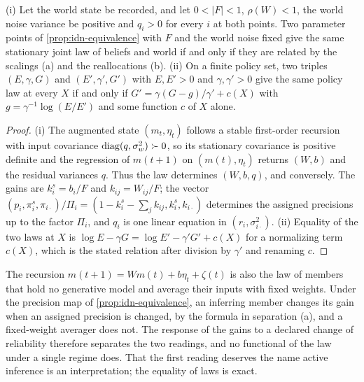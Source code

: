 \begin{corollary}\label{cor:idn-fibre}
(i) Let the world state be recorded, and let $0<|F|<1$, $\rho(W)<1$, the world noise variance be positive and $q_i>0$ for every $i$ at both points. Two parameter points of \cref{prop:idn-equivalence} with $F$ and the world noise fixed give the same stationary joint law of beliefs and world if and only if they are related by the scalings (a) and the reallocations (b). (ii) On a finite policy set, two triples $(E,\gamma,G)$ and $(E',\gamma',G')$ with $E,E'>0$ and $\gamma,\gamma'>0$ give the same policy law at every $X$ if and only if $G'=\gamma(G-g)/\gamma'+c(X)$ with $g=\gamma^{-1}\log(E/E')$ and some function $c$ of $X$ alone.
\end{corollary}

\begin{proof}
(i) The augmented state $(m_t,\eta_t)$ follows a stable first-order recursion with input covariance $\operatorname{diag}(q,\sigma_w^2)\succ0$, so its stationary covariance is positive definite and the regression of $m(t+1)$ on $(m(t),\eta_t)$ returns $(W,b)$ and the residual variances $q$. Thus the law determines $(W,b,q)$, and conversely. The gains are $k^s_i=b_i/F$ and $k_{ij}=W_{ij}/F$; the vector $(p_i,\pi^s_i,\pi_{i\cdot})/\Pi_i=(1-k^s_i-\sum_jk_{ij},k^s_i,k_{i\cdot})$ determines the assigned precisions up to the factor $\Pi_i$, and $q_i$ is one linear equation in $(r_i,\sigma_{i\cdot}^2)$. (ii) Equality of the two laws at $X$ is $\log E-\gamma G=\log E'-\gamma'G'+c(X)$ for a normalizing term $c(X)$, which is the stated relation after division by $\gamma'$ and renaming $c$.
\end{proof}

\begin{remark}\label{rem:idn-averager}
The recursion $m(t+1)=Wm(t)+b\eta_t+\zeta(t)$ is also the law of members that hold no generative model and average their inputs with fixed weights. Under the precision map of \cref{prop:idn-equivalence}, an inferring member changes its gain when an assigned precision is changed, by the formula in separation (a), and a fixed-weight averager does not. The response of the gains to a declared change of reliability therefore separates the two readings, and no functional of the law under a single regime does. That the first reading deserves the name active inference is an interpretation; the equality of laws is exact.
\end{remark}

